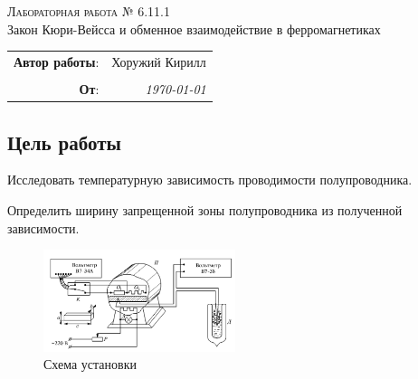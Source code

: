
\begin{center}
    \LARGE \textsc{Лабораторная работа № 6.11.1} \\
    \vspace{3 mm}
    \large Закон Кюри-Вейсса и обменное взаимодействие в ферромагнетиках
\end{center}


\phantom{42}

\begin{flushright}
    \begin{tabular}{rr}
        \textbf{Автор работы}: 
        & Хоружий Кирилл \\
        & \\
        \textbf{От}: &
        \textit{\today}\\
    \end{tabular}
\end{flushright}

\thispagestyle{empty}

\vspace{10mm}


\subsection*{Цель работы}
\begin{enumerate*}
    \item Исследовать температурную зависимость проводимости полупроводника.
    \item Определить ширину запрещенной зоны полупроводника из полученной зависимости.

\end{enumerate*}


\vfill

\begin{figure}[h]
    \centering
    \includegraphics[width=0.5\textwidth]{exp.png}
    \caption{Схема установки}
    \label{fig:exp}
\end{figure}


